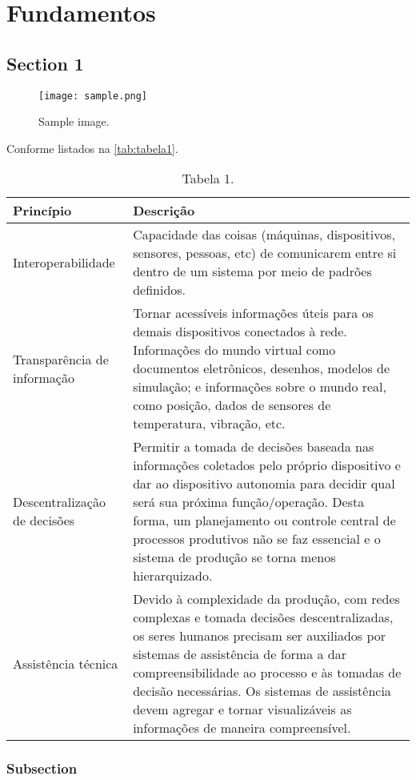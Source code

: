 \chapter{Fundamentos}
\label{cha:fundamentos}
	
	\lipsum

\section{Section 1}
\label{sec:industria4}

	\lipsum

	\begin{figure}[htb]
		\centering
		\texttt{[image: sample.png]}
		\caption{Sample image.}
		\label{fig:sample2}
	\end{figure}

	Conforme listados na \autoref{tab:tabela1}.
	
	\begin{table}[htb]
		\centering
		\footnotesize
		\begin{tabular}{p{3cm}p{12cm}}
			\hline
			\textbf{Princípio} & \textbf{Descrição} \\
			
			\hline
			Interoperabilidade &
			Capacidade das coisas (máquinas, dispositivos, sensores, pessoas, etc) de comunicarem entre si dentro de um sistema por meio de padrões definidos. \\
			
			\hline
			Transparência de informação &
			Tornar acessíveis informações úteis para os demais dispositivos conectados à rede. Informações do mundo virtual como documentos eletrônicos, desenhos, modelos de simulação; e informações sobre o mundo real, como posição, dados de sensores de temperatura, vibração, etc. \\
			
			\hline
			Descentralização de decisões &
			Permitir a tomada de decisões baseada nas informações coletados pelo próprio dispositivo e dar ao dispositivo autonomia para decidir qual será sua próxima função/operação. Desta forma, um planejamento ou controle central de processos produtivos não se faz essencial e o sistema de produção se torna menos hierarquizado. \\
			
			\hline
			Assistência técnica &
			Devido à complexidade da produção, com redes complexas e tomada decisões descentralizadas, os seres humanos precisam ser auxiliados por sistemas de assistência de forma a dar compreensibilidade ao processo e às tomadas de decisão necessárias. Os sistemas de assistência devem agregar e tornar visualizáveis as informações de maneira compreensível. \\
			
			\hline
		\end{tabular}
		\caption{Tabela 1.}
		\label{tab:tabela1}
	\end{table}

	\subsection{Subsection }
	\label{sub:rami4}
	
	\lipsum